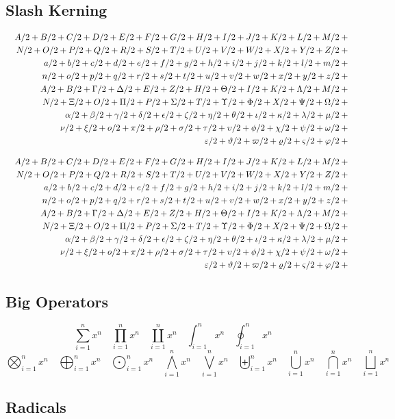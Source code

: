 \subsection{Slash Kerning \showfamily}

\def\test#1{1/#1+{}}
\begin{eqnarray*}
  && {\testupperi}\\
  && {\testupperii}\\
  && {\testloweri}\\ 
  && {\testlowerii}\\ 
  && {\testupgreeki}\\
  && {\testupgreekii}\\
  && {\testlowgreeki}\\
  && {\testlowgreekii}\\
  && {\testlowgreekiii}
\end{eqnarray*}

\def\test#1{#1/2+{}}
\begin{eqnarray*}
  && {\testupperi}\\
  && {\testupperii}\\
  && {\testloweri}\\ 
  && {\testlowerii}\\ 
  && {\testupgreeki}\\
  && {\testupgreekii}\\
  && {\testlowgreeki}\\
  && {\testlowgreekii}\\
  && {\testlowgreekiii}
\end{eqnarray*}


\subsection{Big Operators \showfamily}

\def\testop#1{#1_{i=1}^{n} x^{n} \quad}
\begin{displaymath}
  \testop\sum 
  \testop\prod 
  \testop\coprod 
  \testop\int 
  \testop\oint
\end{displaymath}
\begin{displaymath}
  \testop\bigotimes 
  \testop\bigoplus
  \testop\bigodot
  \testop\bigwedge 
  \testop\bigvee 
  \testop\biguplus 
  \testop\bigcup 
  \testop\bigcap 
  \testop\bigsqcup 
\end{displaymath}


\subsection{Radicals \showfamily}

